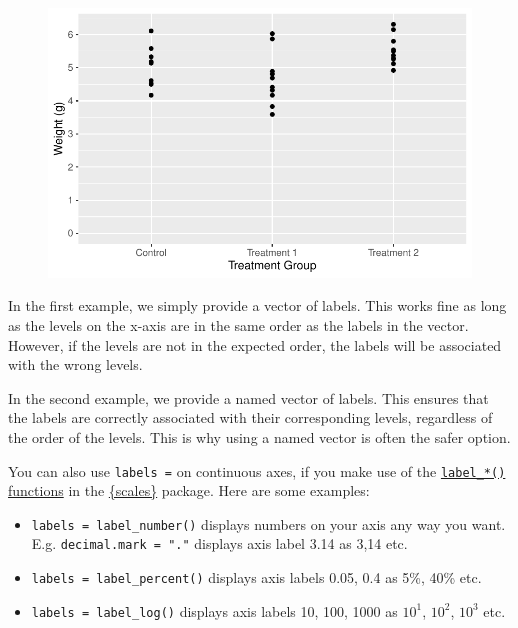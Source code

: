 \documentclass[
  letterpaper,
  DIV=11,
  numbers=noendperiod]{scrartcl}
\providecommand{\tightlist}{%
  \setlength{\itemsep}{0pt}\setlength{\parskip}{0pt}}\usepackage{longtable,booktabs,array}
\begin{document}
\begin{figure}[H]

{\centering \includegraphics{ggplot2intro_files/figure-pdf/unnamed-chunk-13-1.pdf}

}

\end{figure}

In the first example, we simply provide a vector of labels. This works
fine as long as the levels on the x-axis are in the same order as the
labels in the vector. However, if the levels are not in the expected
order, the labels will be associated with the wrong levels.

In the second example, we provide a named vector of labels. This ensures
that the labels are correctly associated with their corresponding
levels, regardless of the order of the levels. This is why using a named
vector is often the safer option.

\begin{tcolorbox}[enhanced jigsaw, coltitle=black, colbacktitle=quarto-callout-tip-color!10!white, titlerule=0mm, rightrule=.15mm, toprule=.15mm, left=2mm, arc=.35mm, colframe=quarto-callout-tip-color-frame, bottomrule=.15mm, toptitle=1mm, breakable, colback=white, bottomtitle=1mm, title=\textcolor{quarto-callout-tip-color}{\faLightbulb}\hspace{0.5em}{Tip}, opacitybacktitle=0.6, leftrule=.75mm, opacityback=0]

You can also use \texttt{labels\ =} on continuous axes, if you make use
of the
\href{https://scales.r-lib.org/reference/index.html\#axis-labels}{\texttt{label\_*()}
functions} in the \href{https://scales.r-lib.org/index.html}{\{scales\}}
package. Here are some examples:

\begin{itemize}
\tightlist
\item
  \texttt{labels\ =\ label\_number()} displays numbers on your axis any
  way you want. E.g. \texttt{decimal.mark\ =\ "."} displays axis label
  3.14 as 3,14 etc.
\item
  \texttt{labels\ =\ label\_percent()} displays axis labels 0.05, 0.4 as
  5\%, 40\% etc.
\item
  \texttt{labels\ =\ label\_log()} displays axis labels 10, 100, 1000 as
  \(10^1\), \(10^2\), \(10^3\) etc.
\end{itemize}

\end{tcolorbox}
\end{document}
